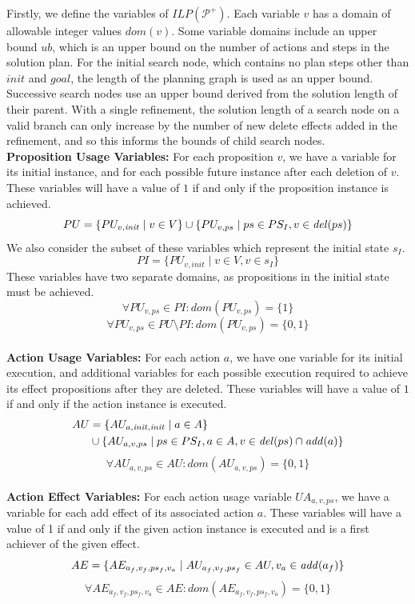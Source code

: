 Firstly, we define the variables of $\mathit{ILP}(\mathcal{P}^+)$. Each variable $v$ has a domain of allowable integer values $\mathit{dom}(v)$. Some variable domains include an upper bound $\mathit{ub}$, which is an upper bound on the number of actions and steps in the solution plan. For the initial search node, which contains no plan steps other than $\mathit{init}$ and $\mathit{goal}$, the length of the planning graph is used as an upper bound. Successive search nodes use an upper bound derived from the solution length of their parent. With a single refinement, the solution length of a search node on a valid branch can only increase by the number of new delete effects added in the refinement, and so this informs the bounds of child search nodes.\\


\textbf{Proposition Usage Variables:} For each proposition $v$, we have a variable for its initial instance, and for each possible future instance after each deletion of $v$. These variables will have a value of $1$ if and only if the proposition instance is achieved.
\[PU=\{PU_{v,\mathit{init}} \mid v\in V\}\cup\{PU_{v,ps} \mid ps \in PS_I, v\in\mathit{del}(ps)\}\]
We also consider the subset of these variables which represent the initial state $s_I$.
\[PI=\{PU_{v,\mathit{init}} \mid v\in V,v\in s_I\}\]
These variables have two separate domains, as propositions in the initial state must be achieved.
\[\forall PU_{v,ps}\in PI: \mathit{dom}(PU_{v,ps})=\{1\}\]
\[\forall PU_{v,ps}\in PU\setminus PI: \mathit{dom}(PU_{v,ps})=\{0,1\}\]\\


\textbf{Action Usage Variables:} For each action $a$, we have one variable for its initial execution, and additional variables for each possible execution required to achieve its effect propositions after they are deleted. These variables will have a value of $1$ if and only if the action instance is executed.
\begin{align*}
AU&=\{AU_{a,\mathit{init},\mathit{init}} \mid a\in A\} \\
&\cup\{AU_{a,v,ps} \mid ps \in PS_I,a\in A,v\in\mathit{del}(ps)\cap \mathit{add} (a)\}
\end{align*}
\[\forall AU_{a,v,ps}\in AU: \mathit{dom}(AU_{a,v,ps})=\{0,1\}\]\\


\textbf{Action Effect Variables:} For each action usage variable $UA_{a,v,ps}$, we have a variable for each add effect of its associated action $a$. These variables will have a value of 1 if and only if the given action instance is executed and is a first achiever of the given effect.
\[AE=\{AE_{a_f,v_f,ps_f,v_a} \mid AU_{a_f,v_f,ps_f}\in AU, v_a\in \mathit{add} (a_f)\}\]
\[\forall AE_{a_f,v_f,ps_f,v_a}\in AE: \mathit{dom}(AE_{a_f,v_f,ps_f,v_a})=\{0,1\}\]\\


